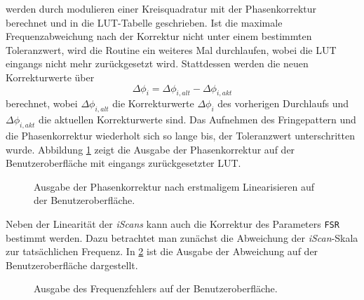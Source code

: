 werden durch modulieren einer Kreisquadratur mit der Phasenkorrektur
berechnet und in die LUT-Tabelle geschrieben. Ist die
maximale Frequenzabweichung nach der Korrektur nicht unter einem bestimmten Toleranzwert, wird die Routine ein weiteres Mal durchlaufen,
wobei die LUT eingangs nicht mehr zurückgesetzt wird. Stattdessen werden
die neuen Korrekturwerte über
\begin{equation}\label{eq:LUT_korrektur_02}
	\Delta\phi_i=\Delta\phi_{i,alt}-\Delta\phi_{i,akt}
\end{equation}
berechnet, wobei $\Delta\phi_{i,alt}$ die Korrekturwerte $\Delta\phi_i$
des vorherigen Durchlaufs und $\Delta\phi_{i,akt}$ die aktuellen Korrekturwerte
sind. Das Aufnehmen des Fringepattern und die Phasenkorrektur wiederholt sich so
lange bis, der Toleranzwert unterschritten wurde. Abbildung
\ref{fig:linearisierung_benutzeroberflaeche_phasenkorrektur} zeigt die Ausgabe der Phasenkorrektur auf der Benutzeroberfläche mit eingangs zurückgesetzter LUT.\par
\begin{figure}[h]
 	\centering
	\caption[Benutzeroberfläche Linearisierung -
	Phasenkorrektur]{Ausgabe der Phasenkorrektur nach erstmaligem Linearisieren auf
	der Benutzeroberfläche.}\label{fig:linearisierung_benutzeroberflaeche_phasenkorrektur}
\end{figure}
Neben der Linearität der \textit{iScans} kann auch die Korrektur des Parameters
\lstinline|FSR| bestimmt werden. Dazu betrachtet man zunächst die
Abweichung der \textit{iScan}-Skala zur tatsächlichen Frequenz. In
\ref{fig:linearisierung_benutzeroberflaeche_frequenz-abweichung} ist die
Ausgabe der Abweichung auf der Benutzeroberfläche dargestellt.
\begin{figure}[h]
 	\centering
	\caption[Benutzeroberfläche Linearisierung -
	Frequenzfehler]{Ausgabe	des Frequenzfehlers auf der
	Benutzeroberfläche.}\label{fig:linearisierung_benutzeroberflaeche_frequenz-abweichung}
\end{figure}
